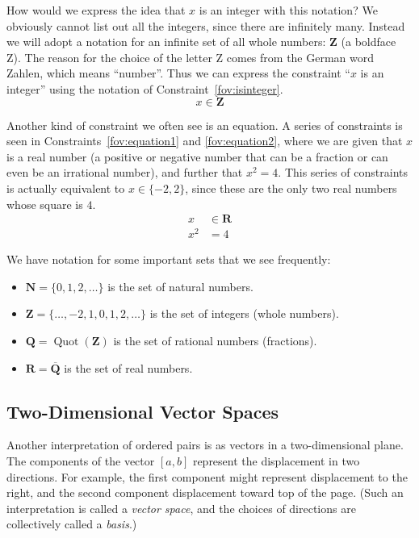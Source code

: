 \documentclass[a4paper,10pt]{report}
\begin{document}
How would we express the idea that \(x\) is an integer with this notation? We obviously
cannot list out all the integers, since there are infinitely many. Instead we will adopt a
notation for an infinite set of all whole numbers: \(\mathbf{Z}\) (a boldface Z). The reason
for the choice of the letter Z comes from the German word Zahlen, which means ``number''.
Thus we can express the constraint ``\(x\) is an integer'' using the notation of
Constraint~\ref{fov:isinteger}.
\begin{equation}
  x \in \mathbf{Z}
  \label{fov:isinteger}
\end{equation}

Another kind of constraint we often see is an equation. A series of constraints is seen in
Constraints~\ref{fov:equation1} and \ref{fov:equation2}, where we are given that \(x\) is a
real number (a positive or negative number that can be a fraction or can even be an
irrational number), and further that \(x^2 = 4\). This series of constraints is actually
equivalent to \(x \in \{-2, 2\}\), since these are the only two real numbers whose square
is \(4\).
\begin{align}
  x &\in \mathbf{R}
  \label{fov:equation1}
  \\
  x^2 &= 4
  \label{fov:equation2}
\end{align}

We have notation for some important sets that we see frequently:

\begin{itemize}
  \item \(\mathbf{N} = \{0, 1, 2, \dots\}\) is the set of natural numbers.
  \item \(\mathbf{Z} = \{\dots, -2, 1, 0, 1, 2, \dots\}\) is the set of integers (whole
  numbers).
  \item \(\mathbf{Q} = \operatorname{Quot}(\mathbf{Z})\) is the set of rational numbers
  (fractions).
  \item \(\mathbf{R} = \overline{\mathbf{Q}}\) is the set of real numbers.
\end{itemize}

\subsection{Two-Dimensional Vector Spaces}

Another interpretation of ordered pairs is as vectors in a two-dimensional plane. The
components of the vector \([a, b]\) represent the displacement in two directions. For
example, the first component might represent displacement to the right, and the second
component displacement toward top of the page. (Such an interpretation is called a
\emph{vector space}, and the choices of directions are collectively called a \emph{basis}.)
\end{document}
